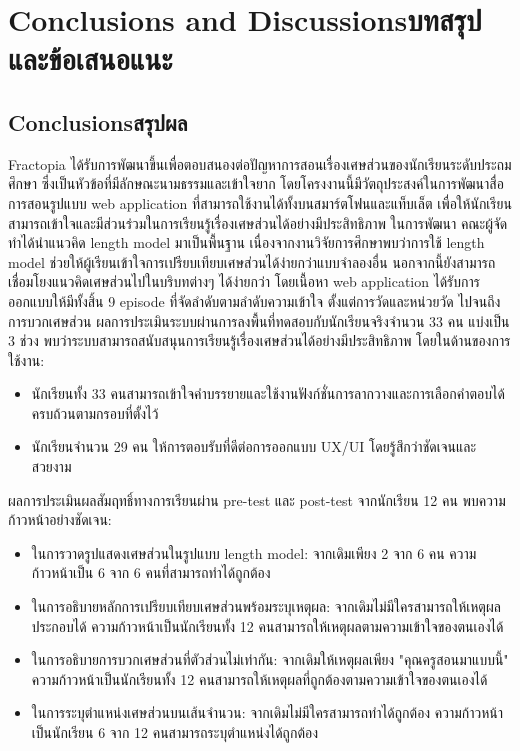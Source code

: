 \chapter{\ifenglish Conclusions and Discussions\else บทสรุปและข้อเสนอแนะ\fi}

\section{\ifenglish Conclusions\else สรุปผล\fi}
Fractopia ได้รับการพัฒนาขึ้นเพื่อตอบสนองต่อปัญหาการสอนเรื่องเศษส่วนของนักเรียนระดับประถมศึกษา ซึ่งเป็นหัวข้อที่มีลักษณะนามธรรมและเข้าใจยาก โดยโครงงานนี้มีวัตถุประสงค์ในการพัฒนาสื่อการสอนรูปแบบ web application ที่สามารถใช้งานได้ทั้งบนสมาร์ตโฟนและแท็บเล็ต เพื่อให้นักเรียนสามารถเข้าใจและมีส่วนร่วมในการเรียนรู้เรื่องเศษส่วนได้อย่างมีประสิทธิภาพ
ในการพัฒนา คณะผู้จัดทำได้นำแนวคิด length model มาเป็นพื้นฐาน เนื่องจากงานวิจัยการศึกษาพบว่าการใช้ length model ช่วยให้ผู้เรียนเข้าใจการเปรียบเทียบเศษส่วนได้ง่ายกว่าแบบจำลองอื่น นอกจากนี้ยังสามารถเชื่อมโยงแนวคิดเศษส่วนไปในบริบทต่างๆ ได้ง่ายกว่า โดยเนื้อหา web application ได้รับการออกแบบให้มีทั้งสิ้น 9 episode ที่จัดลำดับตามลำดับความเข้าใจ ตั้งแต่การวัดและหน่วยวัด ไปจนถึงการบวกเศษส่วน
ผลการประเมินระบบผ่านการลงพื้นที่ทดสอบกับนักเรียนจริงจำนวน 33 คน แบ่งเป็น 3 ช่วง พบว่าระบบสามารถสนับสนุนการเรียนรู้เรื่องเศษส่วนได้อย่างมีประสิทธิภาพ 
โดยในด้านของการใช้งาน:
\begin{itemize}
    \item นักเรียนทั้ง 33 คนสามารถเข้าใจคำบรรยายและใช้งานฟังก์ชั่นการลากวางและการเลือกคำตอบได้ครบถ้วนตามกรอบที่ตั้งไว้
    \item นักเรียนจำนวน 29 คน ให้การตอบรับที่ดีต่อการออกแบบ UX/UI โดยรู้สึกว่าชัดเจนและสวยงาม
\end{itemize}
ผลการประเมินผลสัมฤทธิ์ทางการเรียนผ่าน pre-test และ post-test จากนักเรียน 12 คน พบความก้าวหน้าอย่างชัดเจน:
\begin{itemize}
    \item ในการวาดรูปแสดงเศษส่วนในรูปแบบ length model: จากเดิมเพียง 2 จาก 6 คน ความก้าวหน้าเป็น 6 จาก 6 คนที่สามารถทำได้ถูกต้อง
    \item ในการอธิบายหลักการเปรียบเทียบเศษส่วนพร้อมระบุเหตุผล: จากเดิมไม่มีใครสามารถให้เหตุผลประกอบได้ ความก้าวหน้าเป็นนักเรียนทั้ง 12 คนสามารถให้เหตุผลตามความเข้าใจของตนเองได้
    \item ในการอธิบายการบวกเศษส่วนที่ตัวส่วนไม่เท่ากัน: จากเดิมให้เหตุผลเพียง "คุณครูสอนมาแบบนี้" ความก้าวหน้าเป็นนักเรียนทั้ง 12 คนสามารถให้เหตุผลที่ถูกต้องตามความเข้าใจของตนเองได้
    \item ในการระบุตำแหน่งเศษส่วนบนเส้นจำนวน: จากเดิมไม่มีใครสามารถทำได้ถูกต้อง ความก้าวหน้าเป็นนักเรียน 6 จาก 12 คนสามารถระบุตำแหน่งได้ถูกต้อง
\end{itemize}
